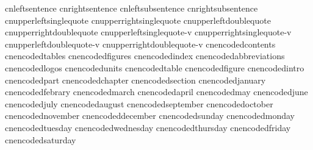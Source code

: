\startencoding[uni-c]
   cnleftsentence            {}
   cnrightsentence           {}
   cnleftsubsentence         {}
   cnrightsubsentence        {}
   cnupperleftsinglequote    {}
   cnupperrightsinglequote   {}
   cnupperleftdoublequote    {}
   cnupperrightdoublequote   {}
   cnupperleftsinglequote-v  {}
   cnupperrightsinglequote-v {}
   cnupperleftdoublequote-v  {}
   cnupperrightdoublequote-v {}
   cnencodedcontents         {}
   cnencodedtables           {}
   cnencodedfigures          {}
   cnencodedindex            {}
   cnencodedabbreviations    {}
   cnencodedlogos            {}
   cnencodedunits            {}
   cnencodedtable            {}
   cnencodedfigure           {}
   cnencodedintro            {}
   cnencodedpart             {}
   cnencodedchapter          {}
   cnencodedsection          {}
   cnencodedjanuary          {}
   cnencodedfebrary          {}
   cnencodedmarch            {}
   cnencodedapril            {}
   cnencodedmay              {}
   cnencodedjune             {}
   cnencodedjuly             {}
   cnencodedaugust           {}
   cnencodedseptember        {}
   cnencodedoctober          {}
   cnencodednovember         {}
   cnencodeddecember         {}
   cnencodedsunday           {}
   cnencodedmonday           {}
   cnencodedtuesday          {}
   cnencodedwednesday        {}
   cnencodedthursday         {}
   cnencodedfriday           {}
   cnencodedsaturday         {}
\stopencoding

